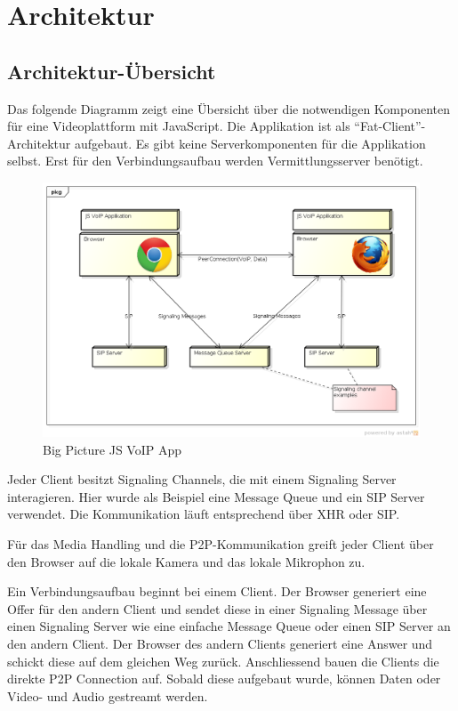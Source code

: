 \chapter{Architektur}

\section{Architektur-Übersicht}
	Das folgende Diagramm zeigt eine Übersicht über die notwendigen Komponenten für eine Videoplattform mit JavaScript. Die Applikation ist als "`Fat-Client"'-Architektur aufgebaut. Es gibt keine Serverkomponenten für die Applikation selbst. Erst für den Verbindungsaufbau werden Vermittlungsserver benötigt.
	\begin{figure}[H]
		\centering
		\includegraphics[width=1\textwidth]{../architekturanalayse/img/bigPicture.png}
		\caption{Big Picture JS VoIP App}
	\end{figure}
	
	Jeder Client besitzt Signaling Channels, die mit einem Signaling Server interagieren. Hier wurde als Beispiel eine Message Queue und ein SIP Server verwendet. Die Kommunikation läuft entsprechend über XHR oder SIP.
	
	Für das Media Handling und die P2P-Kommunikation greift jeder Client über den Browser auf die lokale Kamera und das lokale Mikrophon zu.
	
	Ein Verbindungsaufbau beginnt bei einem Client. Der Browser generiert eine Offer für den andern Client und sendet diese in einer Signaling Message über einen Signaling Server wie eine einfache Message Queue oder einen SIP Server an den andern Client. Der Browser des andern Clients generiert eine Answer und schickt diese auf dem gleichen Weg zurück. Anschliessend bauen die Clients die direkte P2P Connection auf. Sobald diese aufgebaut wurde, können Daten oder Video- und Audio gestreamt werden.
	
